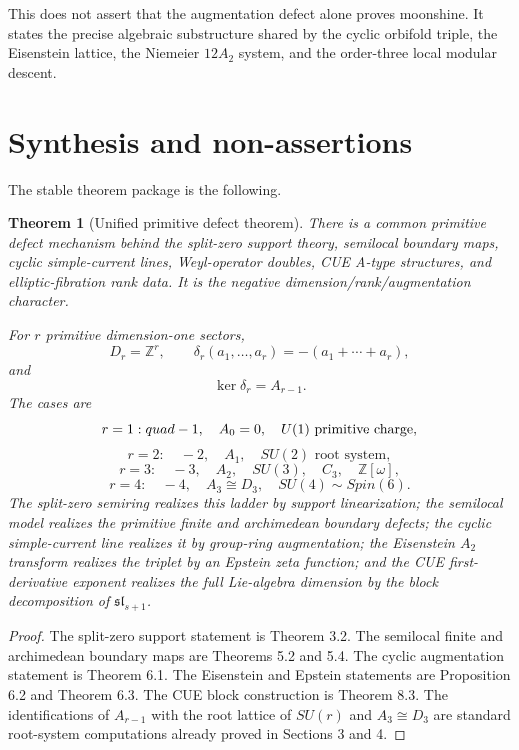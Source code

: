 \documentclass[11pt]{amsart}
\newtheorem{theorem}{Theorem}[section]
\newcommand{\ZZ}{\mathbb Z}
\begin{document}
This does not assert that the augmentation defect alone proves moonshine.  It states the precise algebraic substructure shared by the cyclic orbifold triple, the Eisenstein lattice, the Niemeier $12A_2$ system, and the order-three local modular descent.

\section{Synthesis and non-assertions}

The stable theorem package is the following.

\begin{theorem}[Unified primitive defect theorem]
There is a common primitive defect mechanism behind the split-zero support theory, semilocal boundary maps, cyclic simple-current lines, Weyl-operator doubles, CUE A-type structures, and elliptic-fibration rank data.  It is the negative dimension/rank/augmentation character.

For $r$ primitive dimension-one sectors,
\[
       D_r=\ZZ^r,
       \qquad
       \delta_r(a_1,\ldots,a_r)=-(a_1+\cdots+a_r),
\]
and
\[
       \ker\delta_r=A_{r-1}.
\]
The cases are
\[
       r=1:\\quad -1,
       \quad A_0=0,
       \quad U(1)\text{ primitive charge},
\]
\[
       r=2:
       \quad -2,
       \quad A_1,
       \quad SU(2)\text{ root system},
\]
\[
       r=3:
       \quad -3,
       \quad A_2,
       \quad SU(3),
       \quad C_3,
       \quad \ZZ[\omega],
\]
\[
       r=4:
       \quad -4,
       \quad A_3\cong D_3,
       \quad SU(4)\sim Spin(6).
\]
The split-zero semiring realizes this ladder by support linearization; the semilocal model realizes the primitive finite and archimedean boundary defects; the cyclic simple-current line realizes it by group-ring augmentation; the Eisenstein $A_2$ transform realizes the triplet by an Epstein zeta function; and the CUE first-derivative exponent realizes the full Lie-algebra dimension by the block decomposition of $\mathfrak{sl}_{s+1}$.
\end{theorem}

\begin{proof}
The split-zero support statement is Theorem 3.2.  The semilocal finite and archimedean boundary maps are Theorems 5.2 and 5.4.  The cyclic augmentation statement is Theorem 6.1.  The Eisenstein and Epstein statements are Proposition 6.2 and Theorem 6.3.  The CUE block construction is Theorem 8.3.  The identifications of $A_{r-1}$ with the root lattice of $SU(r)$ and $A_3\cong D_3$ are standard root-system computations already proved in Sections 3 and 4.\end{proof}
\end{document}
